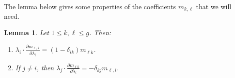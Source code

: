 \documentclass[11pt,letterpaper,english]{amsart}
\numberwithin{equation}{subsection}
\numberwithin{equation}{section}
\theoremstyle{plain}
\newtheorem{lemma}[theorem]{Lemma}
\theoremstyle{remark}
\begin{document}
The lemma below gives some properties of the coefficients $m_{k,\ell}$ that we will need.
\begin{lemma}\label{Lemma:differential-relations}
   Let $1\leq k,\ell\leq g$. Then:
\begin{enumerate}
\item $\lambda_i\cdot\frac{\partial m_{\ell,k}}{\partial\lambda_i}=(1-\delta_{i k})m_{\ell k}$. 

\item If $j\neq i$, then $\lambda_j\cdot\frac{\partial m_{\ell k}}{\partial\lambda_i}=-\delta_{kj}m_{\ell,i}$. 


\end{enumerate}
\end{lemma}
\end{document}
